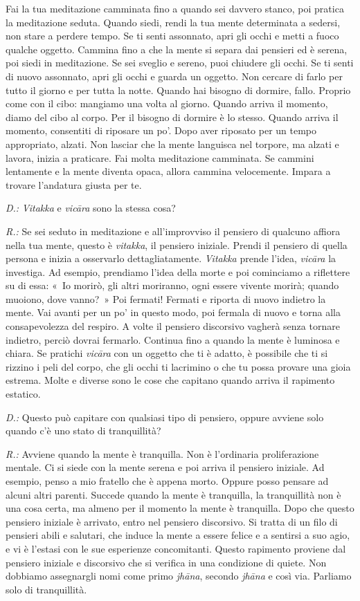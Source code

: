 Fai la tua meditazione camminata fino a quando sei davvero stanco, poi
pratica la meditazione seduta. Quando siedi, rendi la tua mente
determinata a sedersi, non stare a perdere tempo. Se ti senti assonnato,
apri gli occhi e metti a fuoco qualche oggetto. Cammina fino a che la
mente si separa dai pensieri ed è serena, poi siedi in meditazione. Se
sei sveglio e sereno, puoi chiudere gli occhi. Se ti senti di nuovo
assonnato, apri gli occhi e guarda un oggetto. Non cercare di farlo per
tutto il giorno e per tutta la notte. Quando hai bisogno di dormire,
fallo. Proprio come con il cibo: mangiamo una volta al giorno. Quando
arriva il momento, diamo del cibo al corpo. Per il bisogno di dormire è
lo stesso. Quando arriva il momento, consentiti di riposare un po'. Dopo
aver riposato per un tempo appropriato, alzati. Non lasciar che la mente
languisca nel torpore, ma alzati e lavora, inizia a praticare. Fai molta
meditazione camminata. Se cammini lentamente e la mente diventa opaca,
allora cammina velocemente. Impara a trovare l'andatura giusta per te.

\emph{D.:} \emph{Vitakka} e \emph{vicāra} sono la stessa cosa?

\emph{R.:} Se sei seduto in meditazione e all'improvviso il pensiero di
qualcuno affiora nella tua mente, questo è \emph{vitakka}, il pensiero
iniziale. Prendi il pensiero di quella persona e inizia a osservarlo
dettagliatamente. \emph{Vitakka} prende l'idea, \emph{vicāra} la
investiga. Ad esempio, prendiamo l'idea della morte e poi cominciamo a
riflettere su di essa: «~Io morirò, gli altri moriranno, ogni essere
vivente morirà; quando muoiono, dove vanno?~» Poi fermati! Fermati e
riporta di nuovo indietro la mente. Vai avanti per un po' in questo
modo, poi fermala di nuovo e torna alla consapevolezza del respiro. A
volte il pensiero discorsivo vagherà senza tornare indietro, perciò
dovrai fermarlo. Continua fino a quando la mente è luminosa e chiara. Se
pratichi \emph{vicāra} con un oggetto che ti è adatto, è possibile che
ti si rizzino i peli del corpo, che gli occhi ti lacrimino o che tu
possa provare una gioia estrema. Molte e diverse sono le cose che
capitano quando arriva il rapimento estatico.

\emph{D.:} Questo può capitare con qualsiasi tipo di pensiero, oppure avviene
solo quando c'è uno stato di tranquillità?

\emph{R.:} Avviene quando la mente è tranquilla. Non è l'ordinaria
proliferazione mentale. Ci si siede con la mente serena e poi arriva il
pensiero iniziale. Ad esempio, penso a mio fratello che è appena morto.
Oppure posso pensare ad alcuni altri parenti. Succede quando la mente è
tranquilla, la tranquillità non è una cosa certa, ma almeno per il
momento la mente è tranquilla. Dopo che questo pensiero iniziale è
arrivato, entro nel pensiero discorsivo. Si tratta di un filo di
pensieri abili e salutari, che induce la mente a essere felice e a
sentirsi a suo agio, e vi è l'estasi con le sue esperienze concomitanti.
Questo rapimento proviene dal pensiero iniziale e discorsivo che si
verifica in una condizione di quiete. Non dobbiamo assegnargli nomi come
primo \emph{jhāna}, secondo \emph{jhāna} e così via. Parliamo solo di
tranquillità.

